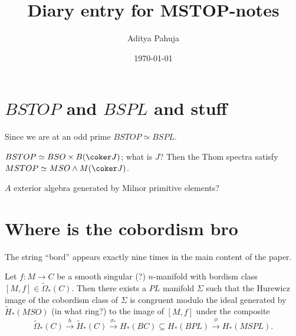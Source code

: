 \documentclass[10pt]{article}
\title{Diary entry for MSTOP-notes}
\author{Aditya Pahuja}
\date{\today}
\begin{document}
\maketitle
\tableofcontents
\pagebreak

\section{$BSTOP$ and $BSPL$ and stuff}

Since we are at an odd prime $BSTOP\simeq BSPL$.

$BSTOP\simeq BSO\times B(\coker J)$; what is $J$?
Then the Thom spectra satisfy $MSTOP\simeq MSO\wedge M(\coker J)$.


$A$ exterior algebra generated by Milnor primitive elements?



\section{Where is the cobordism bro}
The string ``bord'' appears exactly nine times
in the main content of the paper.

\begin{theorem}[13.1]
    \label{thm:13-1}
    Let $f\colon M\to C$ be a smooth singular (?) $n$-manifold
    with bordism class $[M,f]\in\tilde\Omega_*(C)$.
    Then there exists a $PL$ manifold $\Sigma$
    such that the Hurewicz image of the cobordism class of $\Sigma$
    is congruent modulo the ideal generated by $\tilde H_*(MSO)$
    (in what ring?)
    to the image of $[M,f]$ under the composite
    \begin{equation*}
        \tilde\Omega_*(C)\overset h\to \tilde H_*(C)
	\overset{\sigma_*}\to H_*(BC)\subseteq H_*(BPL)
	\overset\phi\to H_*(MSPL).
    \end{equation*}
\end{theorem}
\end{document}
